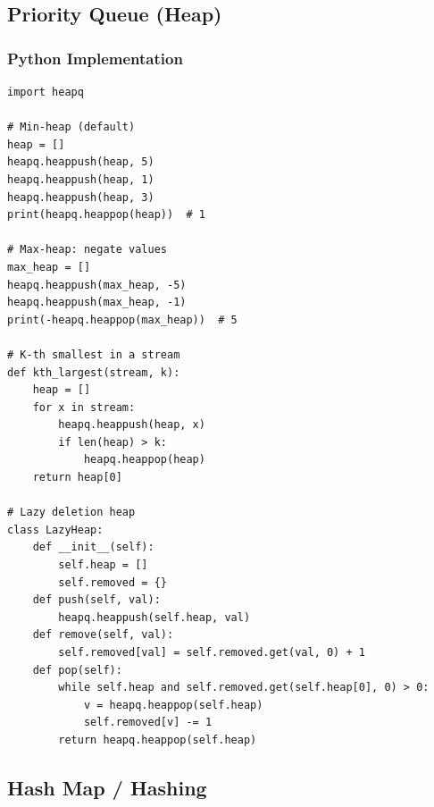 \documentclass[10pt,a4paper]{article}
\theoremstyle{cpstyle}
\begin{document}
\subsection{Priority Queue (Heap)}

\subsubsection{Python Implementation}
\begin{lstlisting}[caption={Priority Queue patterns in Python}]
import heapq

# Min-heap (default)
heap = []
heapq.heappush(heap, 5)
heapq.heappush(heap, 1)
heapq.heappush(heap, 3)
print(heapq.heappop(heap))  # 1

# Max-heap: negate values
max_heap = []
heapq.heappush(max_heap, -5)
heapq.heappush(max_heap, -1)
print(-heapq.heappop(max_heap))  # 5

# K-th smallest in a stream
def kth_largest(stream, k):
    heap = []
    for x in stream:
        heapq.heappush(heap, x)
        if len(heap) > k:
            heapq.heappop(heap)
    return heap[0]

# Lazy deletion heap
class LazyHeap:
    def __init__(self):
        self.heap = []
        self.removed = {}
    def push(self, val):
        heapq.heappush(self.heap, val)
    def remove(self, val):
        self.removed[val] = self.removed.get(val, 0) + 1
    def pop(self):
        while self.heap and self.removed.get(self.heap[0], 0) > 0:
            v = heapq.heappop(self.heap)
            self.removed[v] -= 1
        return heapq.heappop(self.heap)
\end{lstlisting}

\subsection{Hash Map / Hashing}
\end{document}
